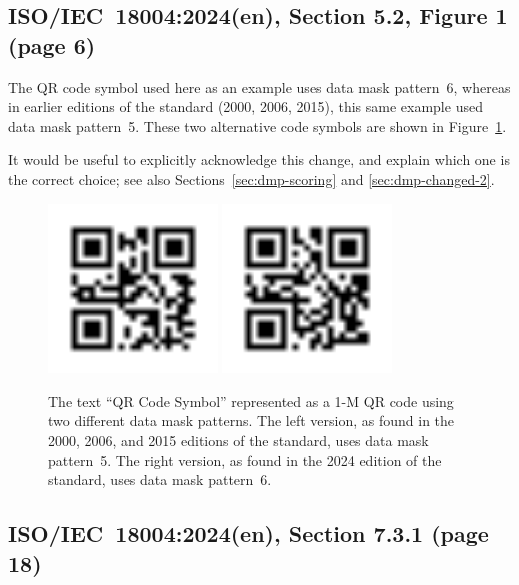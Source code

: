 \documentclass[a4paper,twoside]{article}
\newcommand{\shortstandard}{ISO/IEC~18004}
\newcommand{\standard}{\shortstandard:2024(en)}
\begin{document}
\subsection{\standard, Section 5.2, Figure 1 (page 6)}
\label{sec:dmp-changed-1}

The QR code symbol used here as an example uses data mask pattern~6, whereas in earlier editions of the standard
(2000, 2006, 2015), this same example used data mask pattern~5.
These two alternative code symbols are shown in Figure~\ref{fig:dmp-changed-1}.

It would be useful to explicitly acknowledge this change, and explain which one is the correct choice;
see also Sections~\ref{sec:dmp-scoring} and \ref{sec:dmp-changed-2}.

\begin{figure}[h!]
\centering
\includegraphics[width=0.4\textwidth]{images/qrcode_iso18004_2000_2006_2015_QRCodeSymbol_1Mp5.png}
\includegraphics[width=0.4\textwidth]{images/qrcode_iso18004_2024_QRCodeSymbol_1Mp6.png}
\caption{The text ``QR Code Symbol'' represented as a 1-M QR code using two different data mask patterns.
         The left version, as found in the 2000, 2006, and 2015 editions of the standard, uses data mask pattern~5.
         The right version, as found in the 2024 edition of the standard, uses data mask pattern~6.}
\label{fig:dmp-changed-1}
\end{figure}

\subsection{\standard, Section 7.3.1 (page 18)}
\end{document}
